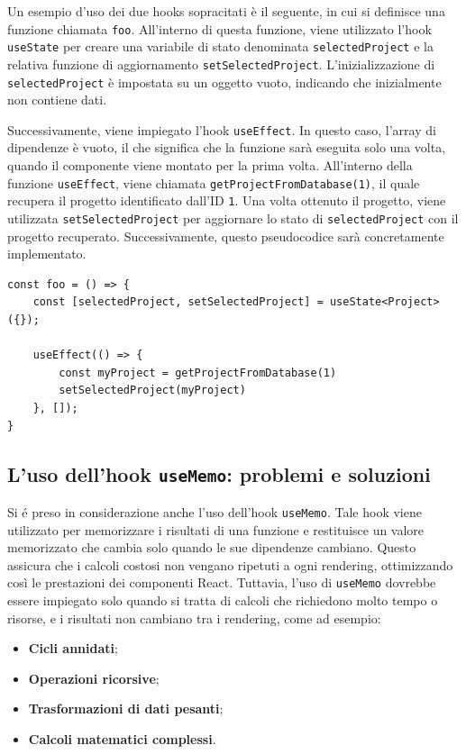 \documentclass[target=bach,aauheader=,style=]{thud}
\begin{document}
\noindent Un esempio d'uso dei due hooks sopracitati è il seguente, in cui si definisce una funzione chiamata \texttt{foo}. All'interno di questa funzione, viene utilizzato l'hook \texttt{useState} per creare una variabile di stato denominata \texttt{selectedProject} e la relativa funzione di aggiornamento \texttt{setSelectedProject}. L'inizializzazione di \texttt{selectedProject} è impostata su un oggetto vuoto, indicando che inizialmente non contiene dati.

\noindent Successivamente, viene impiegato l'hook \texttt{useEffect}. In questo caso, l'array di dipendenze è vuoto, il che significa che la funzione sarà eseguita solo una volta, quando il componente viene montato per la prima volta. All'interno della funzione \texttt{useEffect}, viene chiamata \texttt{getProjectFromDatabase(1)}, il quale recupera il progetto identificato dall'ID \texttt{1}. Una volta ottenuto il progetto, viene utilizzata \texttt{setSelectedProject} per aggiornare lo stato di \texttt{selectedProject} con il progetto recuperato. Successivamente, questo pseudocodice sarà concretamente implementato.

\begin{lstlisting}[caption=Routing dinamico con Next.js]
const foo = () => {
    const [selectedProject, setSelectedProject] = useState<Project>({});

    useEffect(() => {
        const myProject = getProjectFromDatabase(1)
        setSelectedProject(myProject)
    }, []);
}
\end{lstlisting}

\subsection{L'uso dell'hook \texttt{useMemo}: problemi e soluzioni}
\noindent Si é preso in considerazione anche l'uso dell'hook \texttt{useMemo}. Tale hook viene utilizzato per memorizzare i risultati di una funzione e restituisce un valore memorizzato che cambia solo quando le sue dipendenze cambiano. Questo assicura che i calcoli costosi non vengano ripetuti a ogni rendering, ottimizzando così le prestazioni dei componenti React. Tuttavia, l'uso di \texttt{useMemo} dovrebbe essere impiegato solo quando si tratta di calcoli che richiedono molto tempo o risorse, e i risultati non cambiano tra i rendering, come ad esempio:

\begin{itemize}
    \item \textbf{Cicli annidati};
    \item \textbf{Operazioni ricorsive};
    \item \textbf{Trasformazioni di dati pesanti};
    \item \textbf{Calcoli matematici complessi}.
\end{itemize}
\end{document}
